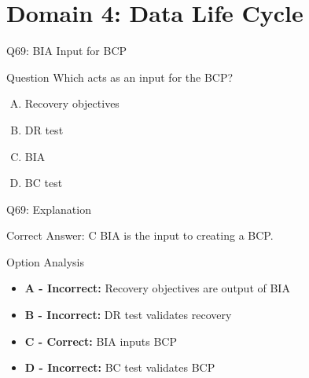 \documentclass{beamer}
\begin{document}
	\section{Domain 4: Data Life Cycle}
	
	\begin{frame}{Q69: BIA Input for BCP}
		\begin{block}{Question}
			Which acts as an input for the BCP?
		\end{block}
		\begin{enumerate}[(A)]
			\item Recovery objectives
			\item DR test
			\item BIA
			\item BC test
		\end{enumerate}
	\end{frame}
	
	\begin{frame}{Q69: Explanation}
		\begin{block}{Correct Answer: C}
			BIA is the input to creating a BCP.
		\end{block}
		\begin{block}{Option Analysis}
			\begin{itemize}
				\item \textbf{A - Incorrect:} Recovery objectives are output of BIA
				\item \textbf{B - Incorrect:} DR test validates recovery
				\item \textbf{C - Correct:} BIA inputs BCP
				\item \textbf{D - Incorrect:} BC test validates BCP
			\end{itemize}
		\end{block}
	\end{frame}
	
\end{document}
